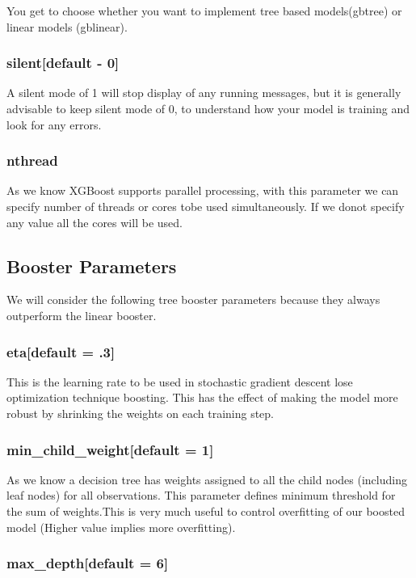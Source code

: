 You get to choose whether you want to implement tree based models(gbtree) or linear 
models (gblinear).

\subsubsection{silent[default - 0]}

A silent mode of 1 will stop display of any running messages, but it is generally 
advisable to keep silent mode of 0, to understand how your model is training and 
look for any errors.

\subsubsection{nthread} 

As we know XGBoost supports parallel processing, with this parameter we can specify
number of threads or cores tobe used simultaneously. If we donot specify any value 
all the cores will be used.

\subsection{Booster Parameters} 

We will consider the following tree booster parameters because they always outperform 
the linear booster.

\subsubsection{eta[default = .3]} 

This is the learning rate to be used in stochastic gradient descent lose optimization 
technique boosting. This has the effect of making the model more robust by shrinking the 
weights on each training step.

\subsubsection{min\_child\_weight[default = 1]} 

As we know a decision tree has weights assigned to all the child nodes (including leaf
nodes) for all observations. This parameter defines minimum threshold for the sum of 
weights.This is very much useful to control overfitting of our boosted model  (Higher 
value implies more overfitting).

\subsubsection{max\_depth[default = 6]} 

